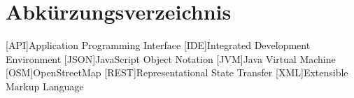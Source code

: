 {}
\renewcommand\refname{Abkürzungsverzeichnis} \chapter*{Abkürzungsverzeichnis}

\begin{acronym}
  [API]{Application Programming Interface}
  [IDE]{Integrated Development Environment}
  [JSON]{JavaScript Object Notation}
  [JVM]{Java Virtual Machine}
  [OSM]{OpenStreetMap}
  [REST]{Representational State Transfer}
  [XML]{Extensible Markup Language}
\end{acronym}
